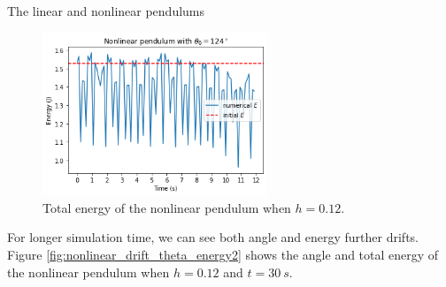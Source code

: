 \documentclass{article}
\begin{document}
\begin{section}{The linear and nonlinear pendulums}
\begin{enumerate}[1.]
\begin{tcolorbox}[breakable]
		\begin{figure}[H]
			\centering
			\includegraphics[width=0.6\textwidth]{images/nonlinear_drift_energy.png}
			\caption{Total energy of the nonlinear pendulum when $h = 0.12$.}
			\label{fig:nonlinear_drift_energy}
		\end{figure}

		For longer simulation time, we can see both angle and energy further drifts. Figure \ref{fig:nonlinear_drift_theta_energy2} shows the angle and total energy of the nonlinear pendulum when $h = 0.12$ and $t = \SI{30}{s}$.


\end{tcolorbox}
\end{enumerate}
\end{section}
\end{document}

